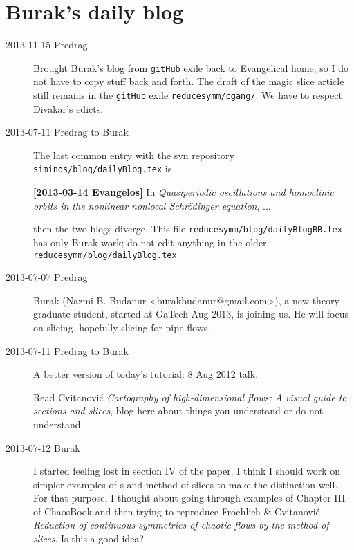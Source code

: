 \section{Burak's daily blog}
\label{sect-dailyBlogBB}

\begin{description}

\item[2013-11-15  Predrag] Brought Burak's blog from \texttt{gitHub} exile back to Evangelical home, so I do not have to copy stuff back and forth. The draft of the magic slice article still remains in the  \texttt{gitHub} exile \texttt{reducesymm/cgang/}. We have to respect Divakar's edicts.

\item[2013-07-11  Predrag to Burak] The last common entry with the svn repository
\\
\texttt{siminos/blog/dailyBlog.tex} is

{\bf [2013-03-14 Evangelos]} In
\emph{Quasiperiodic oscillations and homoclinic orbits in the nonlinear nonlocal
Schr\"odinger equation}, ...

then the two blogs diverge. This file
\texttt{reducesymm/blog/dailyBlogBB.tex}
has only Burak work; do not edit anything in
the older \texttt{reducesymm/blog/dailyBlog.tex}

\item[2013-07-07  Predrag]
Burak (Nazmi B. Budanur <burakbudanur@gmail.com>), a new theory graduate student, started at GaTech Aug 2013, is joining us. He will focus on slicing, hopefully
slicing for pipe flows.

\item[2013-07-11  Predrag to Burak]
A better version of today's tutorial:
 {8 Aug 2012 talk}.

Read  {Cvitanovi\'c \etal} \emph{Cartography of high-dimensional flows: A visual guide to sections and slices}, blog here about things you understand or do not understand.

\item[2013-07-12  Burak] I started feeling lost in section IV of the
    paper. I think I should work on simpler examples of \PoincSec s
    and method of slices to make the distinction well. For
    that purpose, I thought about going through examples of Chapter III
    of ChaosBook and then trying to reproduce
    {Froehlich \& Cvitanovi\'c} \emph{Reduction of continuous
    symmetries of chaotic flows by the method of slices}. Is
    this a good idea?


\end{description}
